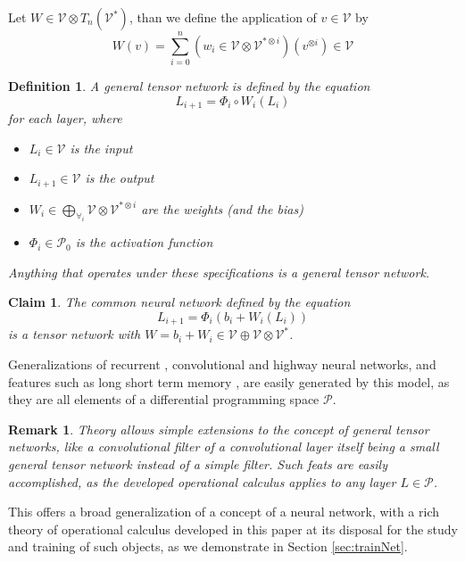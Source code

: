 \documentclass{article}
\newcommand{\VV}{\mathcal{V}}
\newcommand{\dP}{\mathcal{P}}
\newtheorem{definicija}{Definition}[section]
\newtheorem{trditev}{Claim}[section]
\newtheorem{opomba}{Remark}[section]
\begin{document}
Let $W\in \VV\otimes T_n(\VV^*)$, than we define the application of $v\in \VV$ by
\begin{equation}
W(v)=\sum\limits_{i=0}^n(w_i\in \VV\otimes \VV^{*\otimes i})(v^{\otimes i})\in \VV
\end{equation}

\begin{definicija}
A general tensor network is defined by the equation
\begin{equation}
L_{i+1}=\Phi_i\circ W_i(L_i)
\end{equation}
for each layer, where
\begin{itemize}
\item
$L_i\in \VV$ is the input
\item
$L_{i+1}\in \VV$ is the output
\item
$W_i\in \bigoplus\limits_{\forall_i}\VV\otimes \VV^{*\otimes i}$ are the weights (and the bias)
\item
$\Phi_i\in\dP_0$ is the activation function
\end{itemize}
Anything that operates under these specifications is a general tensor network.
\end{definicija}

\begin{trditev}
The common neural network defined by the equation
$$L_{i+1}=\Phi_i(b_i+W_i(L_i))$$
is a tensor network with $W=b_i+W_i\in \VV\oplus \VV\otimes \VV^*$.
\end{trditev}

Generalizations of recurrent \cite{RecurrentNet}, convolutional \cite{ConvNet} and highway  \cite{HighwayNet} neural networks, and features such as long short term memory \cite{LSTM}, are easily generated by this model, as they are all elements of a differential programming space $\dP$.

\begin{opomba}
Theory allows simple extensions to the concept of general tensor networks, like a convolutional filter of a convolutional layer itself being a small general tensor network instead of a simple filter. Such feats are easily accomplished, as the developed operational calculus applies to any layer $L\in\dP$. 
\end{opomba}

This offers a broad generalization of a concept of a neural network, with a rich theory of operational calculus developed in this paper at its disposal for the study and training of such objects, as we demonstrate in Section \ref{sec:trainNet}.
\end{document}
